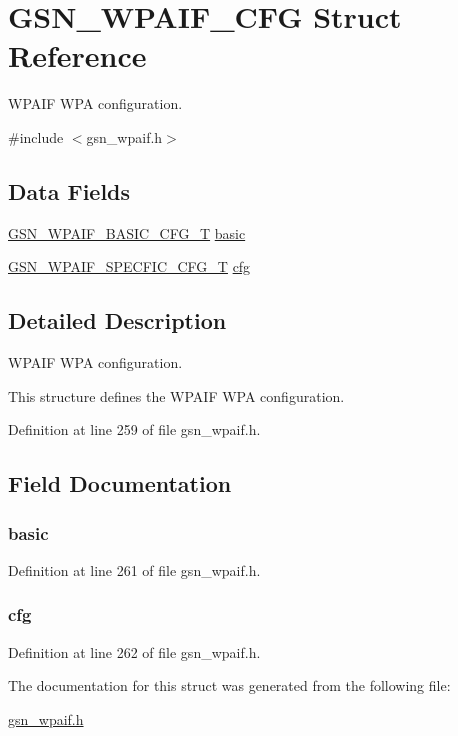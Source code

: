 \hypertarget{a00422}{
\section{GSN\_\-WPAIF\_\-CFG Struct Reference}
\label{a00422}
}


WPAIF WPA configuration.  




{\ttfamily \#include $<$gsn\_\-wpaif.h$>$}

\subsection*{Data Fields}
\begin{DoxyCompactItemize}
\item 
\hyperlink{a00420}{GSN\_\-WPAIF\_\-BASIC\_\-CFG\_\-T} \hyperlink{a00422_a0b64cb3570efad24f16776103779cf30}{basic}
\item 
\hyperlink{a00426}{GSN\_\-WPAIF\_\-SPECFIC\_\-CFG\_\-T} \hyperlink{a00422_a809b70e5990a56343a80d3680fc24216}{cfg}
\end{DoxyCompactItemize}


\subsection{Detailed Description}
WPAIF WPA configuration. 

This structure defines the WPAIF WPA configuration. 

Definition at line 259 of file gsn\_\-wpaif.h.



\subsection{Field Documentation}
\hypertarget{a00422_a0b64cb3570efad24f16776103779cf30}{
\subsubsection[{basic}]{ {\bf basic}}}
\label{a00422_a0b64cb3570efad24f16776103779cf30}


Definition at line 261 of file gsn\_\-wpaif.h.

\hypertarget{a00422_a809b70e5990a56343a80d3680fc24216}{
\subsubsection[{cfg}]{ {\bf cfg}}}
\label{a00422_a809b70e5990a56343a80d3680fc24216}


Definition at line 262 of file gsn\_\-wpaif.h.



The documentation for this struct was generated from the following file:\begin{DoxyCompactItemize}
\item 
\hyperlink{a00615}{gsn\_\-wpaif.h}\end{DoxyCompactItemize}
